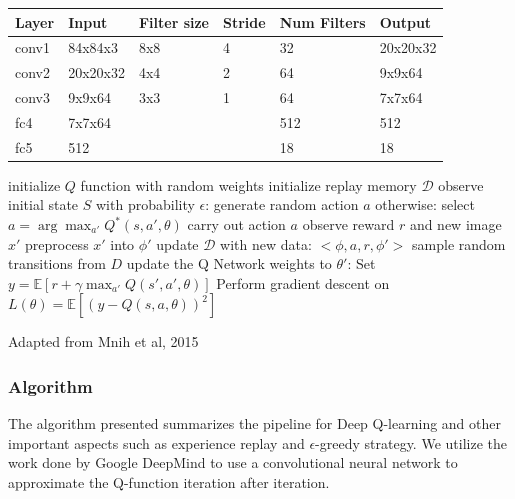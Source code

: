 \documentclass{article}
\begin{document}
\begin{multicols}{2}
\begin{minipage}{\columnwidth}
{
\centering
\begin{tabu} to 0.9\columnwidth {X[0.6]X[1.2]XX[0.6]XX[1.2]}
    \hline
    Layer & Input    & Filter size & Stride & Num Filters & Output   \\[9pt] \hline
    conv1 & 84x84x3  & 8x8         & 4      & 32          & 20x20x32 \\ \hline
    conv2 & 20x20x32 & 4x4         & 2      & 64          & 9x9x64   \\ \hline
    conv3 & 9x9x64   & 3x3         & 1      & 64          & 7x7x64   \\ \hline
    fc4   & 7x7x64   &             &        & 512         & 512      \\ \hline
    fc5   & 512      &             &        & 18          & 18     \\ \hline
\end{tabu}
}
\end{minipage}


\begin{algorithm*}[H]
     \SetAlgoLined
     \label{alg:algo1}
     initialize $Q$ function with random weights \;
     initialize replay memory $\mathcal{D}$ \;
      {
     observe initial state $S$ \;
         {
        \DontPrintSemicolon with probability $\epsilon$: \;
        \PrintSemicolon \Indp generate random action $a$ \;
        \DontPrintSemicolon \Indm otherwise: \;
        \PrintSemicolon \Indp select $a = \arg\max_{a'} Q^*(s,a',\theta)$ \;
        \Indm
        carry out action $a$ \;
        observe reward $r$ and new image $x'$ \;
        preprocess $x'$ into $\phi'$ \;
        update $\mathcal{D}$ with new data: $<\phi,a,r,\phi'>$ \;
        sample random transitions from $D$ \;
        update the Q Network weights to $\theta'$: \;
        \Indp
        Set $y = \mathbb{E}[r + \gamma\max_{a'}Q(s',a',\theta)] $\;
        Perform gradient descent on $L(\theta) = \mathbb{E}[(y - Q(s,a,\theta))^2]$  \;
        }
     }
     \caption{Adapted from Mnih et al, 2015}
\end{algorithm*}

\subsubsection{Algorithm}
The algorithm presented summarizes the pipeline for Deep Q-learning and other important aspects such as experience replay and $\epsilon$-greedy strategy.
We utilize the work done by Google DeepMind to use a convolutional neural network to approximate the Q-function iteration after iteration.



\end{multicols}
\end{document}
